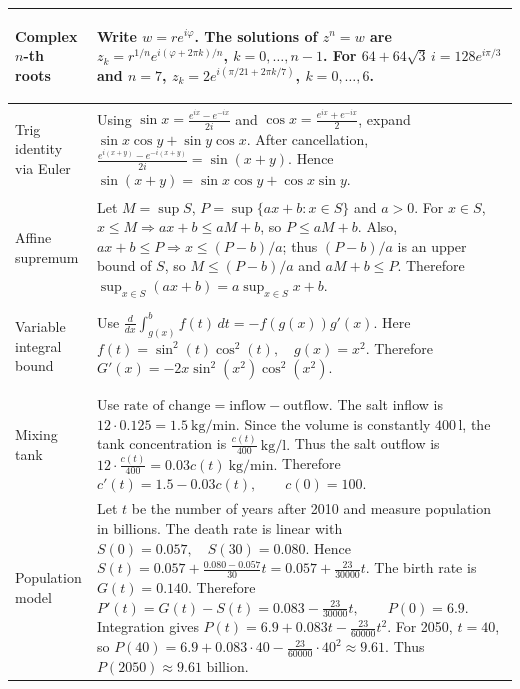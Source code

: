 {\begin{minipage}[t]{0.495\textwidth}
\begin{tabular}{
    @{}
    >{\bfseries\raggedright\arraybackslash}p{3.0cm}
    >{\raggedright\arraybackslash}p{10.4cm}
    @{}
}
\midrule

Complex $n$-th roots &
Write $w=re^{i\varphi}$. The solutions of $z^n=w$ are
$z_k=r^{1/n}e^{i(\varphi+2\pi k)/n}$,
$k=0,\ldots,n-1$.
For
$64+64\sqrt3\,i=128e^{i\pi/3}$ and $n=7$,
$\boxed{z_k=2e^{i(\pi/21+2\pi k/7)}}$,
$k=0,\ldots,6$.
\\

\midrule

Trig identity via Euler &
Using
$\sin x=\frac{e^{ix}-e^{-ix}}{2i}$ and
$\cos x=\frac{e^{ix}+e^{-ix}}2$,
expand
$\sin x\cos y+\sin y\cos x$.
After cancellation,
$\frac{e^{i(x+y)}-e^{-i(x+y)}}{2i}
=\sin(x+y)$.
Hence
$\boxed{\sin(x+y)=\sin x\cos y+\cos x\sin y}$.
\\

\midrule

Affine supremum &
Let $M=\sup S$, $P=\sup\{ax+b:x\in S\}$ and $a>0$.
For $x\in S$,
$x\le M\Rightarrow ax+b\le aM+b$,
so $P\le aM+b$.
Also,
$ax+b\le P\Rightarrow x\le(P-b)/a$;
thus $(P-b)/a$ is an upper bound of $S$, so
$M\le(P-b)/a$ and $aM+b\le P$.
Therefore
$\boxed{\sup_{x\in S}(ax+b)=a\sup_{x\in S}x+b}$.
\\

\midrule

Variable integral bound &
Use
$
\frac{d}{dx}\int_{g(x)}^{b}f(t)\,dt
=
-f(g(x))g'(x).
$
Here
$
f(t)=\sin^2(t)\cos^2(t),
\quad
g(x)=x^2.
$
Therefore
$
\boxed{
G'(x)
=
-2x\sin^2(x^2)\cos^2(x^2)
}.
$
\\

\midrule

Mixing tank &
Use
$
\text{rate of change}
=
\text{inflow}-\text{outflow}.
$
The salt inflow is
$
12\cdot0.125=1.5\ \mathrm{kg/min}.
$
Since the volume is constantly $400\,\mathrm l$, the tank concentration is
$
\frac{c(t)}{400}\ \mathrm{kg/l}.
$
Thus the salt outflow is
$
12\cdot\frac{c(t)}{400}
=
0.03c(t)\ \mathrm{kg/min}.
$
Therefore
$
\boxed{
c'(t)=1.5-0.03c(t),
\qquad
c(0)=100
}.
$
\\

\midrule

Population model &
Let $t$ be the number of years after 2010 and measure population in billions.
The death rate is linear with
$
S(0)=0.057,
\quad
S(30)=0.080.
$
Hence
$
S(t)
=
0.057+\frac{0.080-0.057}{30}t
=
0.057+\frac{23}{30000}t.
$
The birth rate is
$
G(t)=0.140.
$
Therefore
$
P'(t)=G(t)-S(t)
=
0.083-\frac{23}{30000}t,
\qquad
P(0)=6.9.
$
Integration gives
$
P(t)
=
6.9+0.083t-\frac{23}{60000}t^2.
$
For 2050, $t=40$, so
$
P(40)
=
6.9+0.083\cdot40-\frac{23}{60000}\cdot40^2
\approx9.61.
$
Thus
$
\boxed{P(2050)\approx9.61\text{ billion}}.
$
\\


\end{tabular}
\end{minipage}}
